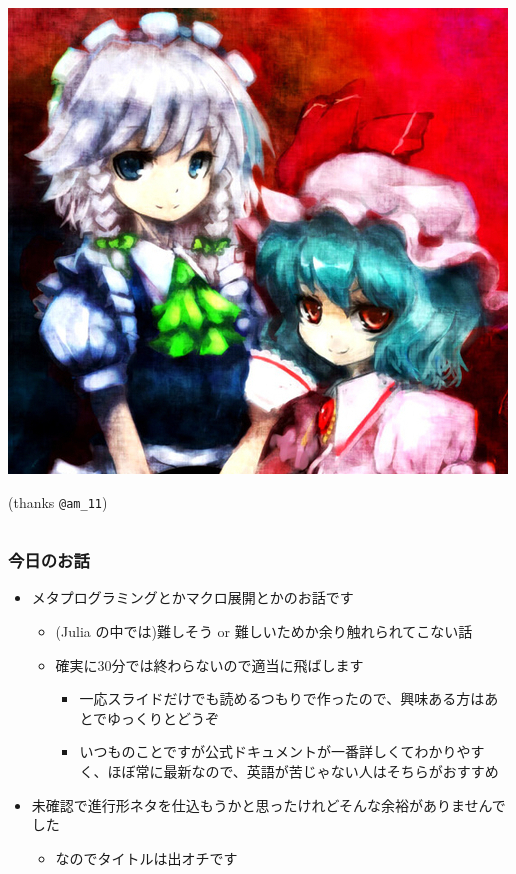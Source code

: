 \documentclass[dvipdfmx]{beamer}
\begin{document}
\begin{frame}[containsverbatim]
\begin{columns}
\begin{column}{.3\linewidth}
  \includegraphics[width=\linewidth]{sakuremi.jpg}

  (thanks \verb|@am_11|)
\end{column}
  \end{columns}
\end{frame}

\begin{frame}
  \frametitle{今日のお話}
  \tableofcontents
  \begin{itemize}
    \item メタプログラミングとかマクロ展開とかのお話です
      \begin{itemize}
        \item (Julia の中では)難しそう or 難しいためか余り触れられてこない話
        \item 確実に30分では終わらないので適当に飛ばします
          \begin{itemize}
            \item 一応スライドだけでも読めるつもりで作ったので、興味ある方はあとでゆっくりとどうぞ
            \item いつものことですが公式ドキュメントが一番詳しくてわかりやすく、ほぼ常に最新なので、英語が苦じゃない人はそちらがおすすめ
          \end{itemize}
      \end{itemize}
    \item 未確認で進行形ネタを仕込もうかと思ったけれどそんな余裕がありませんでした
      \begin{itemize}
        \item なのでタイトルは出オチです
      \end{itemize}
  \end{itemize}
\end{frame}




\end{document}
